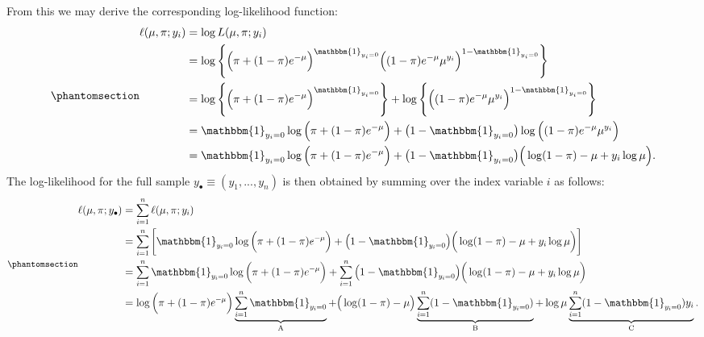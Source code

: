 \documentclass[
  12pt]{article}
\begin{document}
From this we may derive the corresponding log-likelihood function:
\begin{equation}\phantomsection\label{eq-4-1-7}{
\begin{aligned}
\ell(\mu, \pi; y_i) &= \log L(\mu, \pi; y_i) \\
                    &= \log\Bigg\{\Big(\pi + (1 - \pi)e^{-\mu}\Big)^{\mathbbm{1}_{y_i = 0}}\Big(   (1-\pi)e^{-\mu}\mu^{y_i}\Big)^{1 - {\mathbbm{1}_{y_i = 0}}} \Bigg\} \\
                    &= \log \Bigg\{\Big(\pi + (1 - \pi)e^{-\mu}\Big)^{\mathbbm{1}_{y_i = 0}} \Bigg\} + \log \Bigg\{ \Big(   (1-\pi)e^{-\mu}\mu^{y_i}\Big)^{1 - {\mathbbm{1}_{y_i = 0}}} \Bigg\} \\
                    &= \mathbbm{1}_{y_i = 0} \log\Big(\pi + (1 - \pi)e^{-\mu}\Big) + \big(1- \mathbbm{1}_{y_i = 0}\big)\log\Big((1-\pi)e^{-\mu}\mu^{y_i}\Big) \\
                    &= \mathbbm{1}_{y_i = 0} \log\Big(\pi + (1 - \pi)e^{-\mu}\Big) + \big(1- \mathbbm{1}_{y_i = 0}\big)\Big(\log(1-\pi) - \mu + y_i \log \mu\Big).
\end{aligned}
}\end{equation} The log-likelihood for the full sample
\(y_{\bullet} \equiv (y_1, ..., y_n)\) is then obtained by summing over
the index variable \(i\) as follows:
\begin{equation}\phantomsection\label{eq-4-1-8}{
\fontsize{12pt}{12pt}\selectfont
\begin{aligned}
\ell(\mu, \pi; y_{\bullet}) &= \sum_{i=1}^n \ell(\mu, \pi; y_i) \\
                            &= \sum_{i=1}^n \bigg[\mathbbm{1}_{y_i = 0} \log\Big(\pi + (1 - \pi)e^{-\mu}\Big) + \big(1- \mathbbm{1}_{y_i = 0}\big)\Big(\log(1-\pi) - \mu + y_i \log \mu\Big)\bigg] \\
                            &= \sum_{i=1}^n \mathbbm{1}_{y_i = 0} \log\Big(\pi + (1 - \pi)e^{-\mu}\Big) + \sum_{i=1}^n\big(1- \mathbbm{1}_{y_i = 0}\big)\Big(\log(1-\pi) - \mu + y_i \log \mu\Big) \\
                            &= \log\Big(\pi + (1 - \pi)e^{-\mu}\Big) \underbrace{\sum_{i=1}^n \mathbbm{1}_{y_i = 0}}_{\text{A}} + \big(\log(1-\pi) - \mu\big)\underbrace{\sum_{i=1}^n (1-\mathbbm{1}_{y_i = 0})}_{\text{B}} + \log \mu \underbrace{\sum_{i=1}^n (1-\mathbbm{1}_{y_i = 0}) y_i}_{\text{C}}.
\end{aligned}
}\end{equation}
\end{document}
